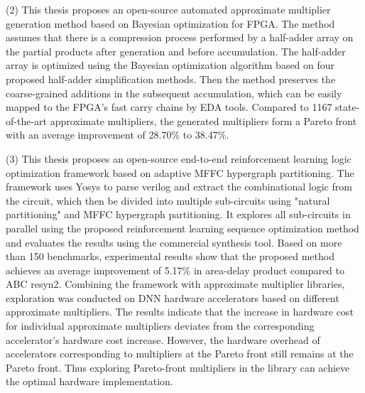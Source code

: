 \begin{abstract*}
      (2) This thesis proposes an open-source automated approximate multiplier generation method based on Bayesian optimization for FPGA. The method assumes that there is a compression process performed by a half-adder array on the partial products after generation and before accumulation.
      The half-adder array is optimized using the Bayesian optimization algorithm based on four proposed half-adder simplification methods. Then the method preserves the coarse-grained additions in the subsequent accumulation, which can be easily mapped to the FPGA's fast carry chains by EDA tools.
      Compared to 1167 state-of-the-art approximate multipliers, the generated multipliers form a Pareto front with an average improvement of 28.70\% to 38.47\%.
    
      (3) This thesis proposes an open-source end-to-end reinforcement learning logic optimization framework based on adaptive MFFC hypergraph partitioning. The framework uses Yosys to parse verilog and extract the combinational logic from the circuit, which then be divided into multiple sub-circuits using "natural partitioning" and MFFC hypergraph partitioning. It explores all sub-circuits in parallel using the proposed reinforcement learning sequence optimization method and evaluates the results using the commercial synthesis tool. Based on more than 150 benchmarks, experimental results show that the proposed method achieves an average improvement of 5.17\% in area-delay product compared to ABC resyn2. 
      Combining the framework with approximate multiplier libraries, exploration was conducted on DNN hardware accelerators based on different approximate multipliers. The results indicate that the increase in hardware cost for individual approximate multipliers deviates from the corresponding accelerator's hardware cost increase. However, the hardware overhead of accelerators corresponding to multipliers at the Pareto front still remains at the Pareto front. Thus exploring Pareto-front multipliers in the library can achieve the optimal hardware implementation.
\end{abstract*}